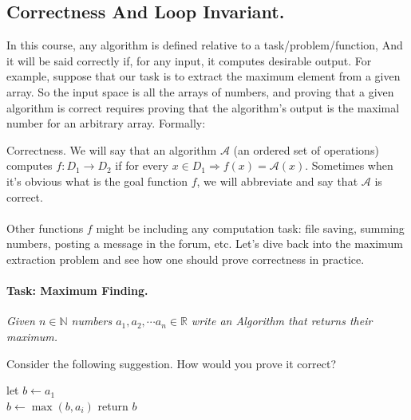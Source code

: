

\subsection*{Correctness And Loop Invariant.}
In this course, any algorithm is defined relative to a task/problem/function, And it will be said correctly if, for any input, it computes desirable output. For example, suppose that our task is to extract the maximum element from a given array. 
So the input space is all the arrays of numbers, and proving that a given algorithm is correct requires proving that the algorithm's output is the maximal number for an arbitrary array. Formally:  
\begin{defbox}{Correctness.}
We will say that an algorithm \( \mathcal{A}\) (an ordered set of operations) computes \( f:D_1 \rightarrow D_2 \) if for every \(x \in D_1 \Rightarrow f(x) = \mathcal{A}(x)\). Sometimes when it's obvious what is the goal function \(f\), we will abbreviate and say that \( \mathcal{A}\) is correct.       
\end{defbox}
\paragraph{}
Other functions \(f\) might be including any computation task: file saving, summing numbers, posting a message in the forum, etc. Let's dive back into the maximum extraction problem and see how one should prove correctness in practice.     
\paragraph{Task: Maximum Finding.} \textit{Given $n\in \mathbb{N}$ numbers $a_1, a_2, \cdots a_n \in \mathbb{R}$ write an Algorithm that returns their maximum.} 

Consider the following suggestion. How would you prove it correct?  

\begin{algorithm*}[H]
 let \(b \leftarrow a_1 \) \\ 
  { 
        \(b \leftarrow \max \left(b, a_i \right) \)
    } 
 return \( b \) 
\end{algorithm*}

